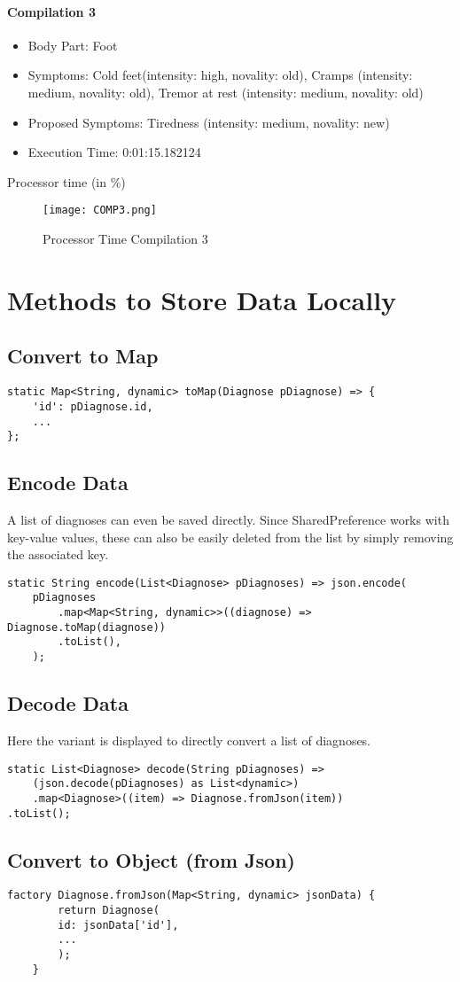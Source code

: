 \subsubsection{Compilation 3}
\begin{itemize}
	\item Body Part: Foot
	\item Symptoms: Cold feet(intensity: high, novality: old), Cramps  (intensity: medium, novality: old), Tremor at rest  (intensity: medium, novality: old)
	\item Proposed Symptoms: Tiredness (intensity: medium, novality: new)
	\item Execution Time: 0:01:15.182124
\end{itemize}
Processor time (in \%)
\begin{figure}[H]
	\centering
	\texttt{[image: COMP3.png]}
	\caption{Processor Time Compilation 3}
\end{figure}

\tocless\chapter{Methods to Store Data Locally}
\tocless\section{Convert to Map}
\begin{lstlisting}[caption=Data toMap]
  static Map<String, dynamic> toMap(Diagnose pDiagnose) => {
	'id': pDiagnose.id,
	...
};
\end{lstlisting}
\tocless\section{Encode Data}
A list of diagnoses can even be saved directly. Since SharedPreference works with key-value values, these can also be easily deleted from the list by simply removing the associated key.
\begin{lstlisting}[caption=Encode Data]
  static String encode(List<Diagnose> pDiagnoses) => json.encode(
	pDiagnoses
		.map<Map<String, dynamic>>((diagnose) => Diagnose.toMap(diagnose))
		.toList(),
	);
\end{lstlisting}
\tocless\section{Decode Data}
Here the variant is displayed to directly convert a list of diagnoses.
\begin{lstlisting}[caption=Decode Data]
static List<Diagnose> decode(String pDiagnoses) =>
	(json.decode(pDiagnoses) as List<dynamic>)
	.map<Diagnose>((item) => Diagnose.fromJson(item))
.toList();
\end{lstlisting}
\tocless\section{Convert to Object (from Json)}
\begin{lstlisting}[caption=Data fromJson]
	factory Diagnose.fromJson(Map<String, dynamic> jsonData) {
		return Diagnose(
		id: jsonData['id'],
		...
		);
	}
\end{lstlisting}

